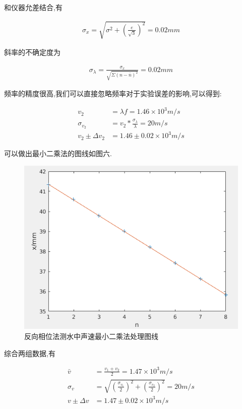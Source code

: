 \documentclass[a4paper,10pt,notitlepage]{article}
\begin{document}
	和仪器允差结合,有
	
\begin{align}
	\sigma_x = \sqrt{\sigma^2 + (\frac{e}{\sqrt{3}})^2} = 0.02 mm 
\end{align}

	斜率的不确定度为
	
\begin{align}
	\sigma_{\lambda} = \frac{\sigma_x}{\sqrt{\Sigma(n - \bar{n})^2}} = 0.02mm
\end{align}

	频率的精度很高,我们可以直接忽略频率对于实验误差的影响,可以得到:
	
\begin{align}
	v_2 &= \lambda f = 1.46 \times 10^3 m/s \\
	\sigma_{v_2} &= v_2 * \frac{\sigma_{\lambda}}{\lambda} = 20 m/s \\
	v_2 \pm \Delta v_2 &= 1.46 \pm 0.02 \times 10^3 m/s 
\end{align}

	可以做出最小二乘法的图线如图六.
	
\begin{figure}[h]
	\includegraphics[scale=0.6]{f6.png}
	\caption{反向相位法测水中声速最小二乘法处理图线}
\end{figure}

	综合两组数据,有
	
\begin{align}
	\bar{v} &= \frac{v_1 + v_2}{2} = 1.47 \times 10^3 m/s \\
	\sigma_v &= \sqrt{(\frac{\sigma_{v_1}}{2})^2 + (\frac{\sigma_{v_2}}{2})^2} = 20 m/s \\
	v \pm \Delta v &= 1.47 \pm 0.02 \times 10^3 m/s 
\end{align}
\end{document}
